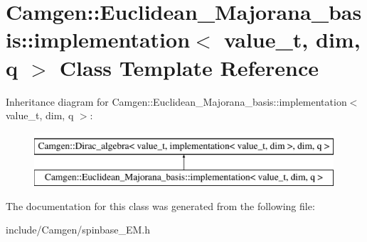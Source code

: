 \hypertarget{a00287}{}\section{Camgen\+:\+:Euclidean\+\_\+\+Majorana\+\_\+basis\+:\+:implementation$<$ value\+\_\+t, dim, q $>$ Class Template Reference}
\label{a00287}
Inheritance diagram for Camgen\+:\+:Euclidean\+\_\+\+Majorana\+\_\+basis\+:\+:implementation$<$ value\+\_\+t, dim, q $>$\+:\begin{figure}[H]
\begin{center}
\leavevmode
\includegraphics[height=2.000000cm]{a00287}
\end{center}
\end{figure}


The documentation for this class was generated from the following file\+:\begin{DoxyCompactItemize}
\item 
include/\+Camgen/spinbase\+\_\+\+E\+M.\+h\end{DoxyCompactItemize}
